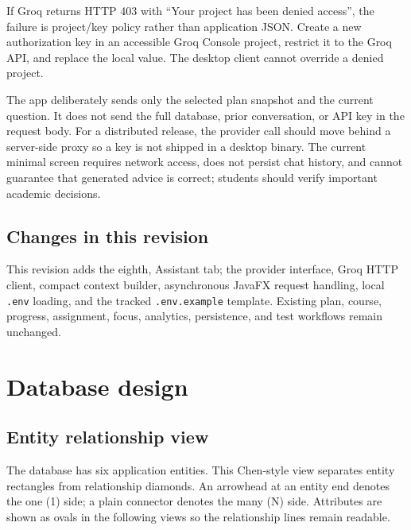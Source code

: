 \documentclass[11pt,a4paper]{article}
\newcommand{\code}[1]{\texttt{#1}}
\begin{document}
If Groq returns HTTP 403 with ``Your project has been denied access'', the failure is project/key policy rather than application JSON. Create a new authorization key in an accessible Groq Console project, restrict it to the Groq API, and replace the local value. The desktop client cannot override a denied project.

The app deliberately sends only the selected plan snapshot and the current question. It does not send the full database, prior conversation, or API key in the request body. For a distributed release, the provider call should move behind a server-side proxy so a key is not shipped in a desktop binary. The current minimal screen requires network access, does not persist chat history, and cannot guarantee that generated advice is correct; students should verify important academic decisions.

\subsection{Changes in this revision}

This revision adds the eighth, Assistant tab; the provider interface, Groq HTTP client, compact context builder, asynchronous JavaFX request handling, local \code{.env} loading, and the tracked \code{.env.example} template. Existing plan, course, progress, assignment, focus, analytics, persistence, and test workflows remain unchanged.

\section{Database design}

\subsection{Entity relationship view}

The database has six application entities. This Chen-style view separates entity rectangles from relationship diamonds. An arrowhead at an entity end denotes the one (1) side; a plain connector denotes the many (N) side. Attributes are shown as ovals in the following views so the relationship lines remain readable.
\end{document}
